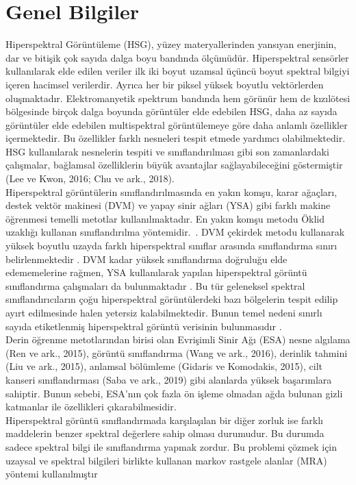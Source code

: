 \chapter{Genel Bilgiler}

Hiperspektral Görüntüleme (HSG), yüzey materyallerinden yansıyan enerjinin, dar ve bitişik çok sayıda dalga boyu bandında
ölçümüdür. Hiperspektral sensörler kullanılarak elde edilen veriler ilk iki boyut uzamsal üçüncü boyut spektral bilgiyi içeren hacimsel
verilerdir. Ayrıca her bir piksel yüksek boyutlu vektörlerden oluşmaktadır. Elektromanyetik spektrum bandında hem görünür hem de
kızılötesi bölgesinde birçok dalga boyunda görüntüler elde edebilen HSG, daha az sayıda görüntüler elde edebilen multispektral
görüntülemeye göre daha anlamlı özellikler içermektedir. Bu özellikler farklı nesneleri tespit etmede yardımcı olabilmektedir. HSG
kullanılarak nesnelerin tespiti ve sınıflandırılması gibi son zamanlardaki çalışmalar, bağlamsal özelliklerin büyük avantajlar
sağlayabileceğini göstermiştir (Lee ve Kwon, 2016; Chu ve ark., 2018).\\

Hiperspektral görüntülerin sınıflandırılmasında en yakın
komşu, karar ağaçları, destek vektör makinesi (DVM) ve
yapay sinir ağları (YSA) gibi farklı makine öğrenmesi
temelli metotlar kullanılmaktadır. En yakın komşu metodu
Öklid uzaklığı kullanan sınıflandırılma yöntemidir.~\cite{blanzieri2008nearest}. DVM
çekirdek metodu kullanarak yüksek boyutlu uzayda farklı
hiperspektral sınıflar arasında sınıflandırma sınırı
belirlenmektedir \cite{melgani2004classification}. DVM kadar yüksek sınıflandırma
doğruluğu elde edememelerine rağmen, YSA kullanılarak
yapılan hiperspektral görüntü sınıflandırma çalışmaları da
bulunmaktadır \cite{ratle2010semisupervised}. Bu tür geleneksel spektral
sınıflandırıcıların çoğu hiperspektral görüntülerdeki bazı
bölgelerin tespit edilip \hfill ayırt  edilmesinde halen yetersiz
kalabilmektedir. Bunun temel nedeni sınırlı sayıda
etiketlenmiş hiperspektral görüntü verisinin bulunmasıdır
\cite{kang2014intrinsic}. \\
Derin öğrenme metotlarından birisi olan Evrişimli Sinir Ağı (ESA) nesne algılama (Ren ve ark., 2015), görüntü sınıflandırma
(Wang ve ark., 2016), derinlik tahmini (Liu ve ark., 2015), anlamsal bölümleme (Gidaris ve Komodakis, 2015), cilt kanseri
sınıflandırması (Saba ve ark., 2019) gibi alanlarda yüksek başarımlara sahiptir. Bunun sebebi, ESA’nın çok fazla ön işleme olmadan
ağda bulunan gizli katmanlar ile özellikleri çıkarabilmesidir. \\
\newpage
Hiperspektral görüntü sınıflandırmada karşılaşılan bir diğer zorluk ise farklı maddelerin benzer spektral değerlere sahip
olması durumudur. Bu durumda sadece spektral bilgi ile
sınıflandırma yapmak zordur. Bu problemi çözmek için
uzaysal ve spektral bilgileri birlikte kullanan markov rastgele
alanlar (MRA) yöntemi kullanılmıştır \cite{tarabalka2010svm} \\

